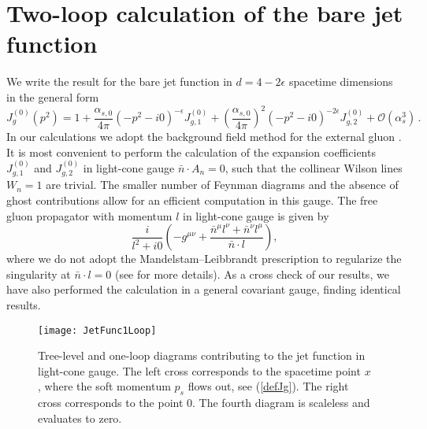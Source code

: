 \documentclass[12pt]{article}
\numberwithin{equation}{section}
\begin{document}
\section{Two-loop calculation of the bare jet function}

We write the result for the bare jet function in $d=4-2\epsilon$ spacetime dimensions in the general form
\begin{equation}\label{Jgbare}
   J_g^{(0)}(p^2) = 1 + \frac{\alpha_{s,0}}{4\pi} \left( -p^2-i0 \right)^{-\epsilon} J_{g,1}^{(0)}
    + \left( \frac{\alpha_{s,0}}{4\pi} \right)^2 \left( -p^2-i0 \right)^{-2\epsilon} J_{g,2}^{(0)}
    + \mathcal{O}(\alpha_s^3) \,.
\end{equation}
In our calculations we adopt the background field method for the external gluon \cite{tHooft:1975uxh,Boulware:1980av,Abbott:1980hw,Abbott:1981ke,Meissner:1986tr}. It is most convenient to perform the calculation of the expansion coefficients $J_{g,1}^{(0)}$ and $J_{g,2}^{(0)}$ in light-cone gauge $\bar n\cdot A_n=0$, such that the collinear Wilson lines $W_n=1$ are trivial. The smaller number of Feynman diagrams and the absence of ghost contributions allow for an efficient computation in this gauge. The free gluon propagator with momentum $l$ in light-cone gauge is given by 
\begin{equation}
   \frac{i}{l^2+i0} \left( - g^{\mu\nu} + \frac{{\bar n}^\mu l^\nu + {\bar n}^\nu l^\mu}{\bar n\cdot l} \right) ,
\end{equation}
where we do not adopt the Mandelstam--Leibbrandt prescription to regularize the singularity at ${\bar n}\cdot l=0$ (see \cite{Becher:2010pd} for more details). As a cross check of our results, we have also performed the calculation in a general covariant gauge, finding identical results. 

\begin{figure}[t]
\begin{center}
\texttt{[image: JetFunc1Loop]}
\caption{\label{fig:diagrams1loop} 
Tree-level and one-loop diagrams contributing to the jet function in light-cone gauge. The left cross corresponds to the spacetime point $x$, where the soft momentum $p_s$ flows out, see (\ref{defJg}). The right cross corresponds to the point 0. The fourth diagram is scaleless and evaluates to zero.}
\end{center}
\end{figure}
\end{document}
